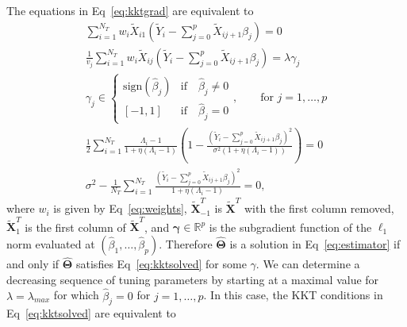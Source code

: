 \documentclass[10pt,letterpaper]{article}
\newcommand{\tm}[1]{\textrm{{#1}}}
\newcommand{\bX}{\textbf{X}}
\newcommand{\bXtilde}{\widetilde{\bX}}
\newcommand{\Xtilde}{\widetilde{X}}
\newcommand{\Ytilde}{\widetilde{Y}}
\newcommand{\bTheta}{\boldsymbol{\Theta}}
\begin{document}
The equations in Eq~\ref{eq:kktgrad} are equivalent to
\begin{equation}
\begin{aligned}
\sum_{i=1}^{N_T}w_i \Xtilde_{i1}\left(  \Ytilde_i - \sum_{j=0}^{p}\Xtilde_{ij+1}\beta_j \right)  = 0\\
\frac{1}{v_j} \sum_{i=1}^{N_T}w_i \Xtilde_{ij}\left(  \Ytilde_i - \sum_{j=0}^{p}\Xtilde_{ij+1}\beta_j \right) =  \lambda \gamma_j \\
\gamma_j \in \begin{cases}
\tm{sign}(\hat{\beta}_j) & \tm{if} \quad \hat{\beta}_j \neq 0 \\
[-1,1] & \tm{if}\quad \hat{\beta}_j = 0
\end{cases}, \qquad \tm{for }j=1, \ldots, p   \\
\frac{1}{2} \sum_{i=1}^{N_T} \frac{\Lambda_i - 1}{1 + \eta(\Lambda_i - 1)} \left(1- \frac{\left(  \Ytilde_i - \sum_{j=0}^{p}\Xtilde_{ij+1}\beta_j \right) ^2}{\sigma^2 (1+\eta(\Lambda_i-1))}  \right) = 0  \\
{\sigma^2} - \frac{1}{N_T}\sum_{i=1}^{N_T}\frac{\left(  \Ytilde_i - \sum_{j=0}^{p}\Xtilde_{ij+1}\beta_j \right) ^2}{1 + \eta (\Lambda_i-1)} = 0,
\end{aligned}\label{eq:kktsolved}
\end{equation}
where $w_i$ is given by Eq~\ref{eq:weights}, $\bXtilde^T_{-1}$ is $\bXtilde^T$ with the first column removed, $\bXtilde^T_1$ is the first column of $\bXtilde^T$, and $\boldsymbol{\gamma} \in \mathbb{R}^p$ is the subgradient function of the $\ell_1$ norm evaluated at $(\hat{\beta}_1, \ldots, \hat{\beta}_p)$. Therefore $\widehat{\bTheta}$ is a solution in Eq~\ref{eq:estimator} if and only if $\widehat{\bTheta}$ satisfies Eq~\ref{eq:kktsolved} for some $\gamma$. %
We can determine a decreasing sequence of tuning parameters by starting at a maximal value for $\lambda = \lambda_{max}$ for which $\hat{\beta}_j = 0$ for $j=1, \ldots, p$. In this case, the KKT conditions in Eq~\ref{eq:kktsolved} are equivalent to
\end{document}
